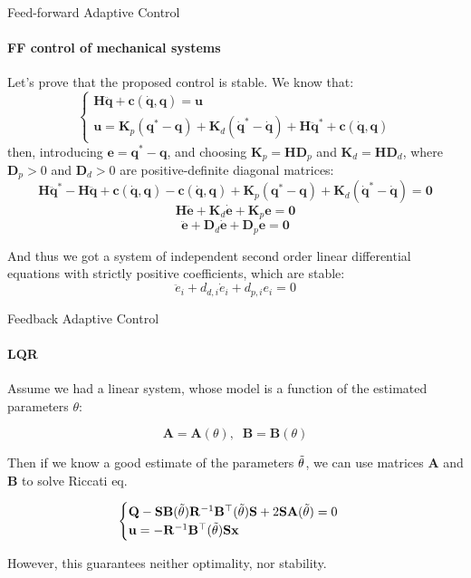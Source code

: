 \documentclass{beamer}
\begin{document}
\begin{frame}{Feed-forward Adaptive Control}
\framesubtitle{FF control of mechanical systems}
\begin{flushleft}

Let's prove that the proposed control is stable. We know that:
%
\[
\begin{cases}
\mathbf H \ddot {\mathbf q} + \mathbf c(\dot {\mathbf q}, \mathbf q) = \mathbf u \\
\mathbf u = \mathbf K_p (\mathbf q^*- \mathbf q) +
            \mathbf K_d (\dot{\mathbf q}^*- \dot{\mathbf q}) +
            \mathbf H \ddot {\mathbf q}^* + \mathbf c(\dot {\mathbf q}, \mathbf q)
\end{cases}
\]
%
then, introducing $\mathbf e = \mathbf q^* - \mathbf q$, and choosing $\mathbf K_p = \mathbf H \mathbf D_p$ and $\mathbf K_d = \mathbf H \mathbf D_d$, where $\mathbf D_p > 0$ and $\mathbf D_d > 0$ are positive-definite diagonal matrices:
\[
\mathbf H \ddot {\mathbf q}^* - \mathbf H \ddot {\mathbf q} +
\mathbf c(\dot {\mathbf q}, \mathbf q) - 
\mathbf c(\dot {\mathbf q}, \mathbf q) + 
\mathbf K_p (\mathbf q^*- \mathbf q) +
\mathbf K_d (\dot{\mathbf q}^*- \dot{\mathbf q}) = \mathbf 0
\]
\[
\mathbf H \ddot {\mathbf e} + \mathbf K_d \dot{\mathbf e} + \mathbf K_p \mathbf e = \mathbf 0
\]
\[
\ddot {\mathbf e} + \mathbf D_d \dot{\mathbf e} + \mathbf D_p \mathbf e = \mathbf 0
\]

And thus we got a system of independent second order linear differential equations with strictly positive coefficients, which are stable:
\[
\ddot {e}_i + d_{d, i} \dot{e}_i + d_{p, i} e_i = 0
\]



\end{flushleft}
\end{frame}


\begin{frame}{Feedback Adaptive Control}
\framesubtitle{LQR}
\begin{flushleft}

Assume we had a linear system, whose model is a function of the estimated parameters $\theta$:

\[
\mathbf A = \mathbf A(\theta),  \; \; \mathbf B = \mathbf B(\theta)
\]

Then if we know a good estimate of the parameters $\Tilde{\theta}$, we can use matrices $\mathbf A$ and $\mathbf B$ to solve Riccati eq.

\[
\begin{cases}
\mathbf Q - \mathbf S \mathbf B(\Tilde{\theta}) \mathbf  R^{-1} \mathbf B^\top(\Tilde{\theta}) \mathbf S + 2 \mathbf S \mathbf A(\Tilde{\theta}) = 0 \\
\mathbf  u = -\mathbf R^{-1} \mathbf B^\top(\Tilde{\theta}) \mathbf S \mathbf x
\end{cases}
\]

However, this guarantees neither optimality, nor stability.

\end{flushleft}
\end{frame}
\end{document}
